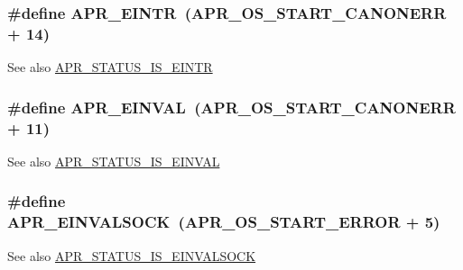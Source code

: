\subsubsection[{\texorpdfstring{A\+P\+R\+\_\+\+E\+I\+N\+TR}{APR_EINTR}}]{\setlength{\rightskip}{0pt plus 5cm}\#define A\+P\+R\+\_\+\+E\+I\+N\+TR~({\bf A\+P\+R\+\_\+\+O\+S\+\_\+\+S\+T\+A\+R\+T\+\_\+\+C\+A\+N\+O\+N\+E\+RR} + 14)}\hypertarget{group__APR__Error_gaee1ce306c0ebf1701b34172310aa1bd5}{}\label{group__APR__Error_gaee1ce306c0ebf1701b34172310aa1bd5}
\begin{DoxySeeAlso}{See also}
\hyperlink{group__APR__STATUS__IS_ga30615baf6479221e44870c620e372b5b}{A\+P\+R\+\_\+\+S\+T\+A\+T\+U\+S\+\_\+\+I\+S\+\_\+\+E\+I\+N\+TR} 
\end{DoxySeeAlso}
\subsubsection[{\texorpdfstring{A\+P\+R\+\_\+\+E\+I\+N\+V\+AL}{APR_EINVAL}}]{\setlength{\rightskip}{0pt plus 5cm}\#define A\+P\+R\+\_\+\+E\+I\+N\+V\+AL~({\bf A\+P\+R\+\_\+\+O\+S\+\_\+\+S\+T\+A\+R\+T\+\_\+\+C\+A\+N\+O\+N\+E\+RR} + 11)}\hypertarget{group__APR__Error_gae3ffc41994444e71ce522c036ca1d9a4}{}\label{group__APR__Error_gae3ffc41994444e71ce522c036ca1d9a4}
\begin{DoxySeeAlso}{See also}
\hyperlink{group__APR__STATUS__IS_ga3f620bb28c1c7f6fd3412dac2137d0fd}{A\+P\+R\+\_\+\+S\+T\+A\+T\+U\+S\+\_\+\+I\+S\+\_\+\+E\+I\+N\+V\+AL} 
\end{DoxySeeAlso}
\subsubsection[{\texorpdfstring{A\+P\+R\+\_\+\+E\+I\+N\+V\+A\+L\+S\+O\+CK}{APR_EINVALSOCK}}]{\setlength{\rightskip}{0pt plus 5cm}\#define A\+P\+R\+\_\+\+E\+I\+N\+V\+A\+L\+S\+O\+CK~({\bf A\+P\+R\+\_\+\+O\+S\+\_\+\+S\+T\+A\+R\+T\+\_\+\+E\+R\+R\+OR} + 5)}\hypertarget{group__APR__Error_ga548032b79ce0671d9986db0654858812}{}\label{group__APR__Error_ga548032b79ce0671d9986db0654858812}
\begin{DoxySeeAlso}{See also}
\hyperlink{group__APR__STATUS__IS_ga7fcc752663660de85fa046b2de014b97}{A\+P\+R\+\_\+\+S\+T\+A\+T\+U\+S\+\_\+\+I\+S\+\_\+\+E\+I\+N\+V\+A\+L\+S\+O\+CK} 
\end{DoxySeeAlso}
